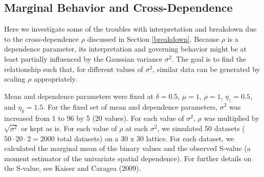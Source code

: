 \documentclass[12pt, a4paper, twoside]{article}
\begin{document}
\subsection{Marginal Behavior and Cross-Dependence}
Here we investigate some of the troubles with interpretation and breakdown due to the cross-dependence $\rho$ discussed in Section \ref{breakdown}. Because $\rho$ is a dependence parameter, its interpretation and governing behavior might be at least partially influenced by the Gaussian variance $\sigma^2$. The goal is to find the relationship such that, for different values of $\sigma^2$, similar data can be generated by scaling $\rho$ appropriately.

Mean and dependence parameters were fixed at $\delta=0.5$, $\mu=1$, $\rho=1$, $\eta_z=0.5$, and $\eta_y=1.5$. For the fixed set of mean and dependence parameters, $\sigma^2$ was increased from 1 to 96 by 5 (20 values). For each value of $\sigma^2$, $\rho$ was multiplied by $\sqrt{\sigma^2}$ or kept as is. For each value of $\rho$ at each $\sigma^2$,  we simulated 50 datasets ($50\cdot20\cdot2=2000$ total datasets) on a 30 x 30 lattice. For each dataset, we calculated the marginal mean of the binary values and the observed S-value (a moment estimator of the univariate spatial dependence). For further details on the S-value, see Kaiser and Caragea (2009).
\end{document}
